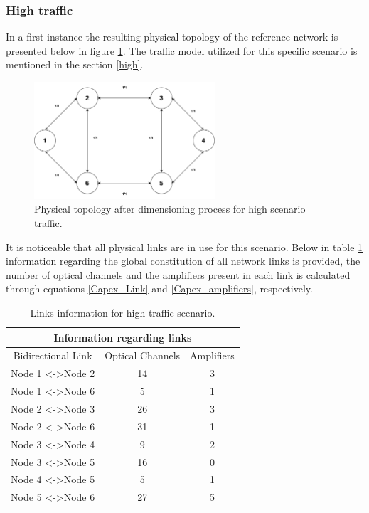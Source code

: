 \subsubsection{High traffic}

In a first instance the resulting physical topology of the reference network is presented below in figure \ref{highPhysicalTopology}. The traffic model utilized for this specific scenario is mentioned in the section \ref{high}.

\begin{figure}[H]
  \begin{center}
    \includegraphics[width=0.6\textwidth]{fig/logos/lowPhysicalTopology.pdf}
    \caption{Physical topology after dimensioning process for high scenario traffic.}
  \end{center}
  \label{highPhysicalTopology}
\end{figure}

It is noticeable that all physical links are in use for this scenario. Below in table \ref{highLinks} information regarding the global constitution of all network links is provided, the number of optical channels and the amplifiers present in each link is calculated through equations \ref{Capex_Link} and \ref{Capex_amplifiers}, respectively.


\begin{table}[H]
\centering
\begin{tabular}{|c|c|c|}
\hline
\multicolumn{3}{|c|}{Information regarding links} \\ \hline
Bidirectional Link & Optical Channels & Amplifiers \\ \hline
Node 1 \textless{}-\textgreater Node 2 & 14 & 3 \\ \hline
Node 1 \textless{}-\textgreater Node 6 & 5 & 1 \\ \hline
Node 2 \textless{}-\textgreater Node 3 & 26 & 3 \\ \hline
Node 2 \textless{}-\textgreater Node 6 & 31 & 1 \\ \hline
Node 3 \textless{}-\textgreater Node 4 & 9 & 2 \\ \hline
Node 3 \textless{}-\textgreater Node 5 & 16 & 0 \\ \hline
Node 4 \textless{}-\textgreater Node 5 & 5 & 1 \\ \hline
Node 5 \textless{}-\textgreater Node 6 & 27 & 5 \\ \hline
\end{tabular}
\caption{Links information for high traffic scenario.}
\label{highLinks}
\end{table}



